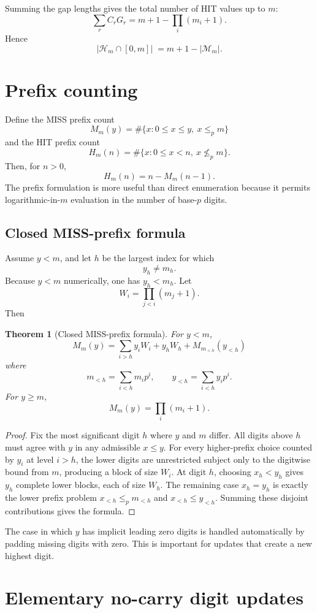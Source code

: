 \documentclass[11pt,a4paper]{article}
\newtheorem{theorem}{Theorem}[section]
\theoremstyle{definition}
\theoremstyle{remark}
\newcommand{\Miss}{\mathcal M}
\newcommand{\Hit}{\mathcal H}
\newcommand{\ip}{\le_p}
\begin{document}
Summing the gap lengths gives the total number of HIT values up to $m$:
\[
 \sum_r C_rG_r
 =m+1-\prod_i(m_i+1).
\]
Hence
\[
 |\Hit_m\cap[0,m]|\;=
 m+1-|\Miss_m|.
\]

\section{Prefix counting}

Define the MISS prefix count
\[
 M_m(y)=
 \#\{x:0\le x\le y,\ x\ip m\}
\]
and the HIT prefix count
\[
 H_m(n)=
 \#\{x:0\le x<n,\ x\not\ip m\}.
\]
Then, for $n>0$,
\[
 H_m(n)=n-M_m(n-1).
\]
The prefix formulation is more useful than direct enumeration because it permits logarithmic-in-$m$ evaluation in the number of base-$p$ digits.

\subsection{Closed MISS-prefix formula}

Assume $y<m$, and let $h$ be the largest index for which
\[
 y_h\ne m_h.
\]
Because $y<m$ numerically, one has $y_h<m_h$.  Let
\[
 W_i=\prod_{j<i}(m_j+1).
\]
Then
\begin{theorem}[Closed MISS-prefix formula]
For $y<m$,
\[
 \boxed{
 M_m(y)=
 \sum_{i>h}y_iW_i
 +y_hW_h
 +M_{m_{<h}}(y_{<h})
 }
\]
where
\[
 m_{<h}=\sum_{i<h}m_ip^i,
 \qquad
 y_{<h}=\sum_{i<h}y_ip^i.
\]
For $y\ge m$,
\[
 M_m(y)=\prod_i(m_i+1).
\]
\end{theorem}
\begin{proof}
Fix the most significant digit $h$ where $y$ and $m$ differ.  All digits above $h$ must agree with $y$ in any admissible $x\le y$.  For every higher-prefix choice counted by $y_i$ at level $i>h$, the lower digits are unrestricted subject only to the digitwise bound from $m$, producing a block of size $W_i$.  At digit $h$, choosing $x_h<y_h$ gives $y_h$ complete lower blocks, each of size $W_h$.  The remaining case $x_h=y_h$ is exactly the lower prefix problem $x_{<h}\ip m_{<h}$ and $x_{<h}\le y_{<h}$.  Summing these disjoint contributions gives the formula.
\end{proof}

The case in which $y$ has implicit leading zero digits is handled automatically by padding missing digits with zero.  This is important for updates that create a new highest digit.

\section{Elementary no-carry digit updates}
\end{document}

